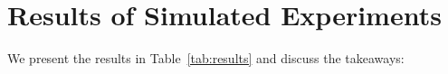 



\section{Results of Simulated Experiments}
\label{sec:quantitative}

We present the results in Table~\ref{tab:results} and discuss the takeaways:


